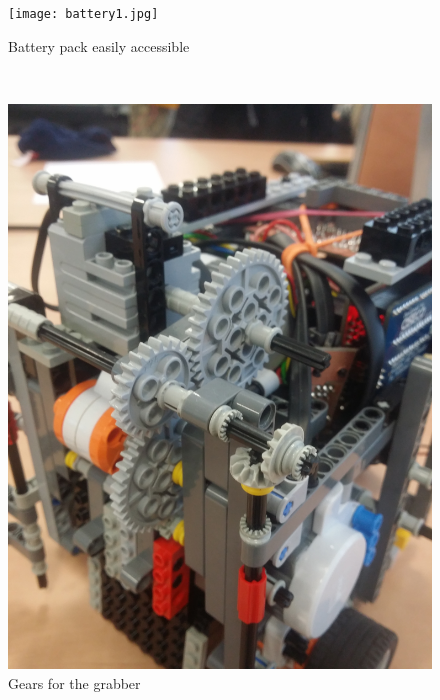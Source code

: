 \documentclass[a4paper,12pt]{article}
\begin{document}
\begin{figure}
	\centering
	\begin{minipage}[b]{.48\textwidth}
        \centering
		\texttt{[image: battery1.jpg]}
		\caption{Battery pack easily accessible}
		\label{fig:battery}
	\end{minipage}
	~
	\begin{minipage}[b]{.48\textwidth}
        \centering
		\includegraphics[scale=.065,angle=-90]{gears.jpg}
		\caption{Gears for the grabber}
		\label{fig:gears}
	\end{minipage}
	
\end{figure}
\end{document}

